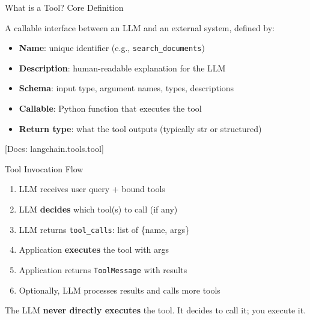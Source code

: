 \documentclass[aspectratio=169,11pt]{beamer}
\newcommand{\docref}[1]{{\scriptsize\color{docgray}[Docs: #1]}}
\begin{document}
\begin{frame}[fragile]{What is a Tool? Core Definition}
\begin{conceptbox}[A Tool is...]
\small
A callable interface between an LLM and an external system, defined by:
\begin{itemize}\setlength{\itemsep}{1pt}
  \item \textbf{Name}: unique identifier (e.g., \texttt{search\_documents})
  \item \textbf{Description}: human-readable explanation for the LLM
  \item \textbf{Schema}: input type, argument names, types, descriptions
  \item \textbf{Callable}: Python function that executes the tool
  \item \textbf{Return type}: what the tool outputs (typically str or structured)
\end{itemize}
\end{conceptbox}


\textcolor{docgray}{\docref{langchain.tools.tool}}
\end{frame}

\begin{frame}[fragile]{Tool Invocation Flow}
\begin{enumerate}\setlength{\itemsep}{1pt}
  \item LLM receives user query + bound tools
  \item LLM \textbf{decides} which tool(s) to call (if any)
  \item LLM returns \texttt{tool\_calls}: list of \{name, args\}
  \item Application \textbf{executes} the tool with args
  \item Application returns \texttt{ToolMessage} with results
  \item Optionally, LLM processes results and calls more tools
\end{enumerate}

\vfill

\begin{tipbox}
The LLM \textbf{never directly executes} the tool. It decides to call it; you execute it.
\end{tipbox}
\end{frame}
\end{document}
